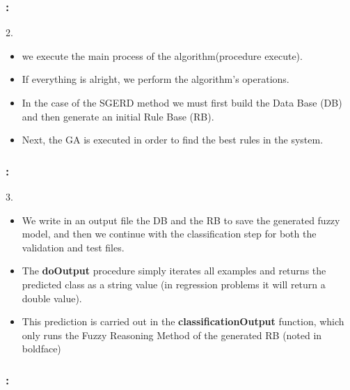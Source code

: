 \documentclass{beamer}
\begin{document}
\begin{CJK*}{UTF8}{bsmi}
\begin{frame}
\end{frame}

\begin{frame}
	\frametitle{\insertsection : \insertsubsection}
	
	\begin{block}{2.}
		\begin{itemize}
			\item we execute the main process of the algorithm(procedure execute). 
			\item If everything is alright, we perform the algorithm’s operations.
			\item In the case of the SGERD method we must first build the Data Base (DB) and then generate an initial Rule Base (RB).
			\item Next, the GA is executed in order to find the best rules in the system.
		\end{itemize}
	\end{block}
	
\end{frame}

\begin{frame}
	\frametitle{\insertsection : \insertsubsection}
	
	\begin{block}{3.}
		\begin{itemize}
			\item We write in an output file the DB and the RB to save the generated fuzzy model, and then we continue with the classification step for both the validation and test files.
			\item The \textbf{doOutput} procedure simply iterates all examples and returns the predicted class as a string value (in regression problems it will return a double value). 
			\item This prediction is carried out in the \textbf{classificationOutput }function, which only runs the Fuzzy Reasoning Method of the generated RB (noted in boldface)
		\end{itemize}
	\end{block}
	
\end{frame}

\begin{frame}
	\frametitle{\insertsection : \insertsubsection}
	

\end{frame}
\end{CJK*}
\end{document}
